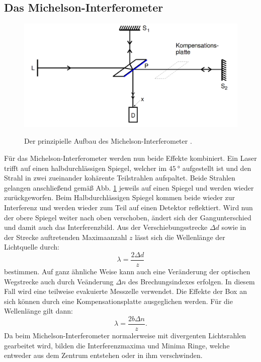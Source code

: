   \subsection{Das Michelson-Interferometer}


  \begin{figure}
  	\centering
  	\caption{Der prinzipielle Aufbau des Michelson-Interferometer \cite{V401}.}
  	\includegraphics[width=\linewidth-150pt,height=\textheight-150pt,keepaspectratio]{content/theoriebau.png}
  	\label{fig:aufbauth}
  \end{figure}
  Für das Michelson-Interferometer werden nun beide Effekte kombiniert. Ein Laser trifft
  auf einen halbdurchlässigen Spiegel, welcher im $\SI{45}{\degree}$ aufgestellt ist und
  den Strahl in zwei zueinander kohärente Teilstrahlen aufspaltet. Beide Strahlen gelangen anschließend
  gemäß Abb. \ref{fig:aufbauth} jeweils auf einen Spiegel und werden wieder zurückgeworfen. Beim
  Halbdurchlässigen Spiegel kommen beide wieder zur Interferenz und werden wieder zum Teil auf
  einen Detektor reflektiert. Wird nun der obere Spiegel weiter nach oben verschoben,
  ändert sich der Gangunterschied und damit auch das Interferenzbild. Aus der Verschiebungsstrecke
  $\Delta d$ sowie in der Strecke auftretenden Maximaanzahl $z$ lässt sich die Wellenlänge der Lichtquelle durch:
  \begin{equation}
    \lambda = \frac{2 \Delta d}{z}\label{lambda}
    \end{equation}
    bestimmen. Auf ganz ähnliche Weise kann auch eine Veränderung der optischen Wegstrecke
     auch durch Veänderung $\Delta n$ des Brechungsindexes erfolgen. In diesem Fall wird eine teilweise evakuierte Messzelle verwendet.
     Die Effekte der Box an sich können durch eine Kompensationsplatte ausgeglichen werden. Für die Wellenlänge gilt dann:
     \begin{equation}
       \lambda = \frac{2 b \Delta n }{z}\text{.}\label{nausdeltan}
       \end{equation}
Da beim Michelson-Interferometer normalerweise mit divergenten Lichtsrahlen gearbeitet wird,
bilden die Interferenzmaxima und Minima Ringe, welche entweder aus dem Zentrum entstehen oder in ihm verschwinden.
